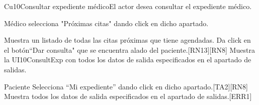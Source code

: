 \begin{UseCase}{Cu10}{Consultar expediente médico}{El actor desea consultar el expediente médico.}
{\begin{itemize}
\begin{itemize}
        \end{itemize}
        \end{itemize}
    }
    
\end{UseCase}

\begin{UCtrayectoria}{Médico}
        \UCpaso[\UCactor] selecciona "Próximas citas" dando click en dicho apartado.
        
        \UCpaso Muestra un listado de todas las citas próximas que tiene agendadas. 
        \UCpaso[\UCactor] Da click en el botón``Dar consulta" que se encuentra alado del paciente.[RN13][RN8]
        \UCpaso Muestra la  UI10ConsultExp con todos los datos de salida especificados en el apartado de salidas.
\end{UCtrayectoria}

\begin{UCtrayectoria}{Paciente}
        \UCpaso[\UCactor] Selecciona ``Mi expediente'' dando click en dicho apartado.[TA2][RN8]
        \UCpaso Muestra todos los datos de salida especificados en el apartado de salidas.[ERR1]
\end{UCtrayectoria}
